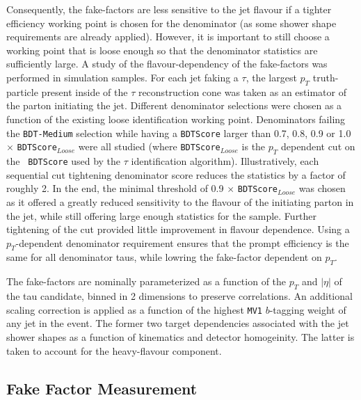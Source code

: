 Consequently, the fake-factors are less sensitive to the jet flavour if a tighter
efficiency working point is chosen for the denominator (as some shower shape requirements
are already applied).  However, it is important to still choose a working point that is
loose enough so that the denominator statistics are sufficiently large. A study of the
flavour-dependency of the fake-factors was performed in simulation samples.  For each jet
faking a $\tau$, the largest $p_{T}$ truth-particle present inside of the $\tau$
reconstruction cone was taken as an estimator of the parton initiating the jet.
Different denominator selections were chosen as a function of the existing loose
identification working point.  Denominators failing the \texttt{BDT-Medium} selection while
having a \texttt{BDTScore} larger than 0.7, 0.8, 0.9 or 1.0 $\times$ \texttt{BDTScore$_{Loose}$}
were all studied (where \texttt{BDTScore$_{Loose}$} is the $p_{T}$ dependent cut on the \texttt{  BDTScore} used by the $\tau$ identification algorithm).  Illustratively, each sequential
cut tightening denominator score reduces the statistics by a factor of roughly 2.  In the
end, the minimal threshold of 0.9 $\times$ \texttt{BDTScore$_{Loose}$} was chosen as it
offered a greatly reduced sensitivity to the flavour of the initiating parton in the jet,
while still offering large enough statistics for the sample. Further tightening of the cut
provided little improvement in flavour dependence. Using a $p_{T}$-dependent denominator
requirement ensures that the prompt efficiency is the same for all denominator taus, while
lowring the fake-factor dependent on $p_{T}$.


The fake-factors are nominally parameterized as a function of the $p_{T}$ and $|\eta|$ of the
tau candidate, binned in 2 dimensions to preserve correlations. An additional scaling
correction is applied as a function of the highest \texttt{MV1} $b$-tagging weight of any jet
in the event.  The former two target dependencies associated with the jet shower shapes as a
function of kinematics and detector homogeinity.  The latter is taken to account for the
heavy-flavour component.

\subsection{Fake Factor Measurement}\label{sec:model-independent-ff-tau-measurement}

